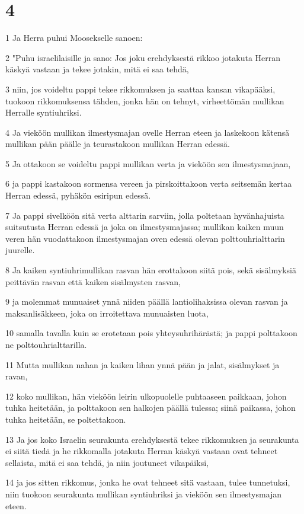 \chapter{4}

\par 1 Ja Herra puhui Moosekselle sanoen:
\par 2 "Puhu israelilaisille ja sano: Jos joku erehdyksestä rikkoo jotakuta Herran käskyä vastaan ja tekee jotakin, mitä ei saa tehdä,
\par 3 niin, jos voideltu pappi tekee rikkomuksen ja saattaa kansan vikapääksi, tuokoon rikkomuksensa tähden, jonka hän on tehnyt, virheettömän mullikan Herralle syntiuhriksi.
\par 4 Ja vieköön mullikan ilmestysmajan ovelle Herran eteen ja laskekoon kätensä mullikan pään päälle ja teurastakoon mullikan Herran edessä.
\par 5 Ja ottakoon se voideltu pappi mullikan verta ja vieköön sen ilmestysmajaan,
\par 6 ja pappi kastakoon sormensa vereen ja pirskoittakoon verta seitsemän kertaa Herran edessä, pyhäkön esiripun edessä.
\par 7 Ja pappi sivelköön sitä verta alttarin sarviin, jolla poltetaan hyvänhajuista suitsutusta Herran edessä ja joka on ilmestysmajassa; mullikan kaiken muun veren hän vuodattakoon ilmestysmajan oven edessä olevan polttouhrialttarin juurelle.
\par 8 Ja kaiken syntiuhrimullikan rasvan hän erottakoon siitä pois, sekä sisälmyksiä peittävän rasvan että kaiken sisälmysten rasvan,
\par 9 ja molemmat munuaiset ynnä niiden päällä lantiolihaksissa olevan rasvan ja maksanlisäkkeen, joka on irroitettava munuaisten luota,
\par 10 samalla tavalla kuin se erotetaan pois yhteysuhrihärästä; ja pappi polttakoon ne polttouhrialttarilla.
\par 11 Mutta mullikan nahan ja kaiken lihan ynnä pään ja jalat, sisälmykset ja ravan,
\par 12 koko mullikan, hän vieköön leirin ulkopuolelle puhtaaseen paikkaan, johon tuhka heitetään, ja polttakoon sen halkojen päällä tulessa; siinä paikassa, johon tuhka heitetään, se poltettakoon.
\par 13 Ja jos koko Israelin seurakunta erehdyksestä tekee rikkomuksen ja seurakunta ei siitä tiedä ja he rikkomalla jotakuta Herran käskyä vastaan ovat tehneet sellaista, mitä ei saa tehdä, ja niin joutuneet vikapäiksi,
\par 14 ja jos sitten rikkomus, jonka he ovat tehneet sitä vastaan, tulee tunnetuksi, niin tuokoon seurakunta mullikan syntiuhriksi ja vieköön sen ilmestysmajan eteen.
